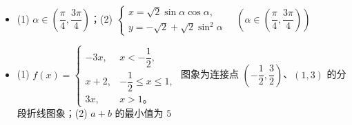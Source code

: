 \begin{itemize}[leftmargin=2.6em]
  \item[\textbf{22.}] (1) $\alpha \in \left(\dfrac\pi4, \dfrac{3\pi}{4}\right)$；(2) $\begin{cases} x = \sqrt2\sin\alpha\cos\alpha, \\ y = -\sqrt2 + \sqrt2\sin^2\alpha \end{cases} \quad \left(\alpha \in \left(\dfrac\pi4, \dfrac{3\pi}{4}\right)\right)$
  \item[\textbf{23.}] (1) $f(x) = \begin{cases} -3x, & x < -\dfrac12, \\ x + 2, & -\dfrac12 \leqslant x \leqslant 1, \\ 3x, & x > 1\mbox{。} \end{cases}$ 图象为连接点 $\left(-\dfrac12, \dfrac32\right)$、$(1, 3)$ 的分段折线图象；(2) $a + b$ 的最小值为 $5$
\end{itemize}
